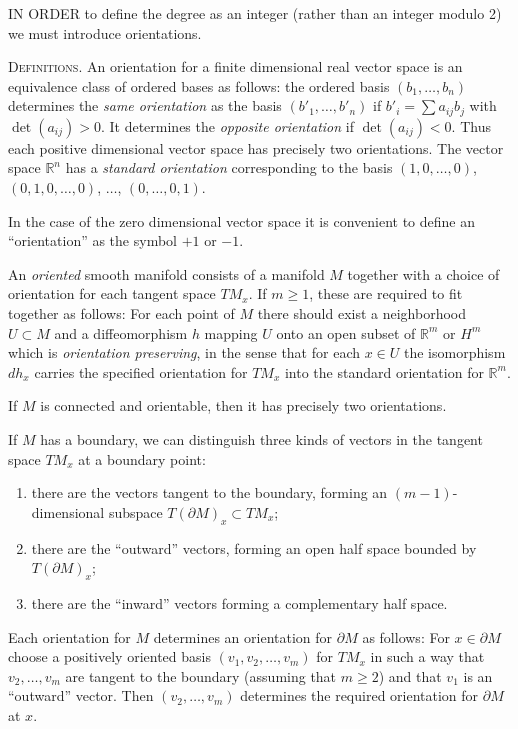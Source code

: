 IN ORDER to define the degree as an integer (rather than an integer modulo 2) we must introduce orientations.

\textsc{Definitions.} An orientation for a finite dimensional real vector space is an equivalence class of ordered bases as follows: the ordered basis $(b_1, \ldots, b_n)$ determines the \emph{same orientation} as the basis $(b'_1, \ldots, b'_n)$ if $b'_i = \sum a_{ij} b_j$ with $\det(a_{ij}) > 0$. It determines the \emph{opposite orientation} if $\det(a_{ij}) < 0$. Thus each positive dimensional vector space has precisely two orientations. The vector space $\mathbb{R}^n$ has a \emph{standard orientation} corresponding to the basis $(1, 0, \ldots, 0)$, $(0, 1, 0, \ldots, 0)$, $\ldots$, $(0, \ldots, 0, 1)$.

In the case of the zero dimensional vector space it is convenient to define an ``orientation'' as the symbol $+1$ or $-1$.

An \emph{oriented} smooth manifold consists of a manifold $M$ together with a choice of orientation for each tangent space $TM_x$. If $m \geq 1$, these are required to fit together as follows: For each point of $M$ there should exist a neighborhood $U \subset M$ and a diffeomorphism $h$ mapping $U$ onto an open subset of $\mathbb{R}^m$ or $H^m$ which is \emph{orientation preserving}, in the sense that for each $x \in U$ the isomorphism $dh_x$ carries the specified orientation for $TM_x$ into the standard orientation for $\mathbb{R}^m$.

If $M$ is connected and orientable, then it has precisely two orientations.

If $M$ has a boundary, we can distinguish three kinds of vectors in the tangent space $TM_x$ at a boundary point:
\begin{enumerate}
\item there are the vectors tangent to the boundary, forming an $(m-1)$-dimensional subspace $T(\partial M)_x \subset TM_x$;
\item there are the ``outward'' vectors, forming an open half space bounded by $T(\partial M)_x$;
\item there are the ``inward'' vectors forming a complementary half space.
\end{enumerate}



Each orientation for $M$ determines an orientation for $\partial M$ as follows: For $x \in \partial M$ choose a positively oriented basis $(v_1, v_2, \ldots, v_m)$ for $TM_x$ in such a way that $v_2, \ldots, v_m$ are tangent to the boundary (assuming that $m \geq 2$) and that $v_1$ is an ``outward'' vector. Then $(v_2, \ldots, v_m)$ determines the required orientation for $\partial M$ at $x$.

